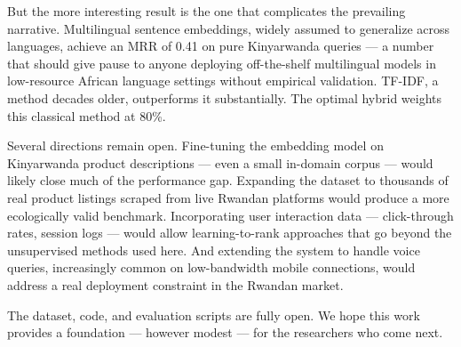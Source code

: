 \documentclass[11pt,a4paper]{article}
\begin{document}
But the more interesting result is the one that complicates the prevailing
narrative. Multilingual sentence embeddings, widely assumed to generalize
across languages, achieve an MRR of 0.41 on pure Kinyarwanda queries — a
number that should give pause to anyone deploying off-the-shelf
multilingual models in low-resource African language settings without
empirical validation. TF-IDF, a method decades older, outperforms it
substantially. The optimal hybrid weights this classical method at 80\%.

Several directions remain open. Fine-tuning the embedding model on
Kinyarwanda product descriptions — even a small in-domain corpus — would
likely close much of the performance gap. Expanding the dataset to
thousands of real product listings scraped from live Rwandan platforms
would produce a more ecologically valid benchmark. Incorporating user
interaction data — click-through rates, session logs — would allow
learning-to-rank approaches that go beyond the unsupervised methods used
here. And extending the system to handle voice queries, increasingly
common on low-bandwidth mobile connections, would address a real deployment
constraint in the Rwandan market.

The dataset, code, and evaluation scripts are fully open. We hope this
work provides a foundation — however modest — for the researchers who
come next.
\end{document}

